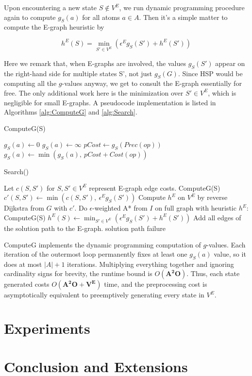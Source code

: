 \documentclass[letterpaper]{article}
\begin{document}
Upon encountering a new state $S\notin V^E$, we run dynamic programming procedure again to compute $g_S(a)$ for all atoms $a\in A$. Then it's a simple matter to compute the E-graph heuristic by

\[h^E(S) = \min_{S'\in V^E} \left( \epsilon^E g_S(S') + h^E(S') \right)\]

Here we remark that, when E-graphs are involved, the values $g_S(S')$ appear on the right-hand side for multiple states S', not just $g_S(G)$. Since HSP would be computing all the $g$-values anyway, we get to consult the E-graph essentially for free. The only additional work here is the minimization over $S'\in V^E$, which is negligible for small E-graphs. A pseudocode implementation is listed in Algorithms \ref{alg:ComputeG} and \ref{alg:Search}.

\begin{algorithm}
\caption{ComputeG(S)}
\label{alg:ComputeG}
\begin{algorithmic}
\STATE $g_S(a) \leftarrow 0$
\ELSE
\STATE $g_S(a) \leftarrow \infty$
\ENDIF
\ENDFOR
\REPEAT
{}
\STATE $pCost \leftarrow g_S(Prec(op))$
\STATE $g_S(a) \leftarrow \min \left(g_S(a),~pCost + Cost(op)\right)$
\ENDFOR
\ENDFOR
{}
\end{algorithmic}
\end{algorithm}

\begin{algorithm}
\caption{Search()}
\label{alg:Search}
\begin{algorithmic}
\STATE Let $c(S,S')$ for $S,S'\in V^E$ represent E-graph edge costs.
\STATE ComputeG(S)
\STATE $c'(S,S') \leftarrow \min\left(c(S,S'),~\epsilon^E g_S(S')\right)$
\ENDFOR
\ENDFOR
\STATE Compute $h^E$ on $V^E$ by reverse Dijkstra from $G$ with $c'$.
\STATE Do $\epsilon$-weighted A* from $I$ on full graph with heuristic $h^E$:
\STATE ComputeG(S)
\STATE $h^E(S) \leftarrow \min_{S'\in V^E} \left( \epsilon^E g_S(S') + h^E(S') \right)$
\ENDFOR
{}
\STATE Add all edges of the solution path to the E-graph.
\RETURN solution path
\ELSE
\RETURN failure
\ENDIF
\end{algorithmic}
\end{algorithm}

ComputeG implements the dynamic programming computation of $g$-values. Each iteration of the outermost loop permanently fixes at least one $g_S(a)$ value, so it does at most $|A|+1$ iterations. Multiplying everything together and ignoring cardinality signs for brevity, the runtime bound is $O(\mathbf{A^2O})$. Thus, each state generated costs $O(\mathbf{A^2O + V^E})$ time, and the preprocessing cost is asymptotically equivalent to preemptively generating every state in $V^E$.

\section{Experiments}



\section{Conclusion and Extensions}
\end{document}
